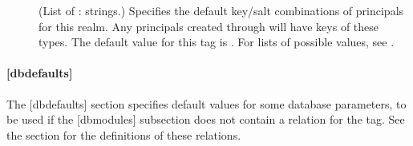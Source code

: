 \documentclass[letterpaper,10pt,english]{sphinxmanual}
\begin{document}
\begin{description}
\item[{}] \leavevmode
(List of : strings.)  Specifies the default key/salt
combinations of principals for this realm.  Any principals created
through {\hyperref[\detokenize{admin/admin_commands/kadmin_local:kadmin-1}]{}} will have keys of these types.  The
default value for this tag is .  For lists of
possible values, see {\hyperref[\detokenize{admin/conf_files/kdc_conf:keysalt-lists}]{}}.

\end{description}


\paragraph{{[}dbdefaults{]}}
\label{\detokenize{admin/conf_files/kdc_conf:id2}}\label{\detokenize{admin/conf_files/kdc_conf:dbdefaults}}
The {[}dbdefaults{]} section specifies default values for some database
parameters, to be used if the {[}dbmodules{]} subsection does not contain
a relation for the tag.  See the {\hyperref[\detokenize{admin/conf_files/kdc_conf:dbmodules}]{}} section for the
definitions of these relations.
\end{document}
